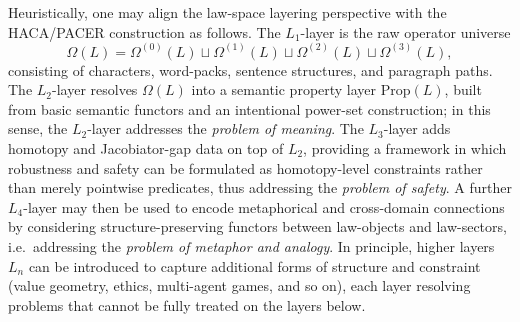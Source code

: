\documentclass[11pt]{book}
\theoremstyle{plain}
\theoremstyle{definition}
\theoremstyle{remark}
\begin{document}
Heuristically, one may align the law-space layering perspective with the
HACA/PACER construction as follows. The $L_1$-layer is the raw operator
universe
\[
  \Omega(L)
  =
  \Omega^{(0)}(L)\sqcup\Omega^{(1)}(L)\sqcup\Omega^{(2)}(L)\sqcup\Omega^{(3)}(L),
\]
consisting of characters, word-packs, sentence structures, and paragraph
paths. The $L_2$-layer resolves $\Omega(L)$ into a semantic property
layer $\mathrm{Prop}(L)$, built from basic semantic functors and an
intentional power-set construction; in this sense, the $L_2$-layer
addresses the \emph{problem of meaning}. The $L_3$-layer adds homotopy
and Jacobiator-gap data on top of $L_2$, providing a framework in which
robustness and safety can be formulated as homotopy-level constraints
rather than merely pointwise predicates, thus addressing the
\emph{problem of safety}. A further $L_4$-layer may then be used to
encode metaphorical and cross-domain connections by considering
structure-preserving functors between law-objects and law-sectors,
i.e.\ addressing the \emph{problem of metaphor and analogy}. In
principle, higher layers $L_n$ can be introduced to capture additional
forms of structure and constraint (value geometry, ethics, multi-agent
games, and so on), each layer resolving problems that cannot be fully
treated on the layers below.
\end{document}
